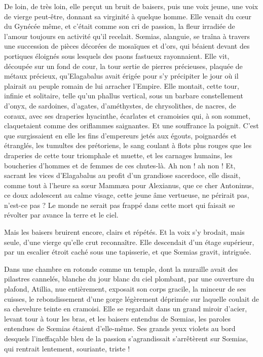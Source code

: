\documentclass[a4paper, 11pt, oneside, polutonikogreek, french]{article}
\begin{document}
De loin, de très loin, elle perçut un bruit de baisers, puis une voix jeune, une voix de vierge peut-être, donnant sa virginité à quelque homme. Elle venait du cœur du Gynécée même, et c'était comme son cri de passion, la fleur irradiée de l'amour toujours en activité qu'il recelait. Sœmias, alanguie, se traîna à travers une succession de pièces décorées de mosaïques et d'ors, qui béaient devant des portiques éloignés sous lesquels des paons fastueux rayonnaient. Elle vit, découpée sur un fond de cour, la tour sertie de pierres précieuses, plaquée de métaux précieux, qu'Elagabalus avait érigée pour s'y précipiter le jour où il plairait au peuple romain de lui arracher l'Empire. Elle montait, cette tour, infinie et solitaire, telle qu'un phallus vertical, sous un barbare constellement d'onyx, de sardoines, d'agates, d'améthystes, de chrysolithes, de nacres, de coraux, avec ses draperies hyacinthe, écarlates et cramoisies qui, à son sommet, claquetaient comme des oriflammes saignantes. Et une souffrance la poignit. C'est que surgissaient en elle les fins d'empereurs jetés aux égouts, poignardés et étranglés, les tumultes des prétoriens, le sang coulant à flots plus rouges que les draperies de cette tour triomphale et muette, et les carnages humains, les boucheries d'hommes et de femmes de ces chutes-là. Ah non ! ah non ! Et, sacrant les vices d'Elagabalus au profit d'un grandiose sacerdoce, elle disait, comme tout à l'heure sa sœur Mammæa pour Alexianus, que ce cher Antoninus, ce doux adolescent au calme visage, cette jeune âme vertueuse, ne périrait pas, n'est-ce pas ? Le monde ne serait pas frappé dans cette mort qui faisait se révolter par avance la terre et le ciel.

Mais les baisers bruirent encore, clairs et répétés. Et la voix s'y brodait, mais seule, d'une vierge qu'elle crut reconnaître. Elle descendait d'un étage supérieur, par un escalier étroit caché sous une tapisserie, et que Sœmias gravit, intriguée.

Dans une chambre en rotonde comme un temple, dont la muraille avait des pilastres cannelés, blanche du jour blanc du ciel plombant, par une ouverture du plafond, Atillia, nue entièrement, exposait son corps gracile, la minceur de ses cuisses, le rebondissement d'une gorge légèrement déprimée sur laquelle coulait de sa chevelure teinte en cramoisi. Elle se regardait dans un grand miroir d'acier, levant tour à tour les bras, et les baisers entendus de Sœmias, les paroles entendues de Sœmias étaient d'elle-même. Ses grands yeux violets au bord desquels l'ineffaçable bleu de la passion s'agrandissait s'arrêtèrent sur Sœmias, qui rentrait lentement, souriante, triste !
\end{document}
